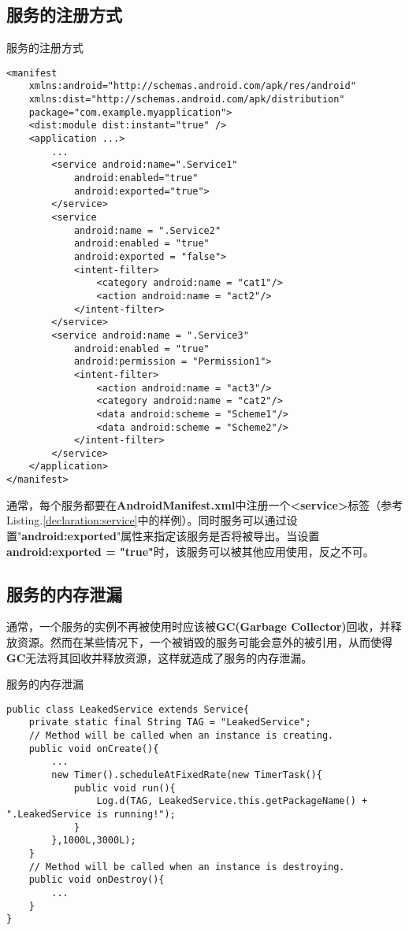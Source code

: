 \subsection{服务的注册方式}
\begin{listing}[htbp]
	\centering
	\caption{服务的注册方式}
	\begin{verbatim}
<manifest
	xmlns:android="http://schemas.android.com/apk/res/android"
	xmlns:dist="http://schemas.android.com/apk/distribution"
	package="com.example.myapplication">
	<dist:module dist:instant="true" />
	<application ...>
		...
		<service android:name=".Service1"
			android:enabled="true"
			android:exported="true">
		</service>
		<service
			android:name = ".Service2"
			android:enabled = "true"
			android:exported = "false">
			<intent-filter>
				<category android:name = "cat1"/>
				<action android:name = "act2"/>
			</intent-filter>
		</service>
		<service android:name = ".Service3"
			android:enabled = "true"
			android:permission = "Permission1">
			<intent-filter>
				<action android:name = "act3"/>
				<category android:name = "cat2"/>
				<data android:scheme = "Scheme1"/>
				<data android:scheme = "Scheme2"/>
			</intent-filter>
		</service>
	</application>
</manifest>
	\end{verbatim}
	\label{declaration:service}
\end{listing}
通常，每个服务都要在\textbf{AndroidManifest.xml}中注册一个\textbf{<service>}标签（参考Listing.\textcolor{red}{\ref{declaration:service}}中的样例）。同时服务可以通过设置"\textbf{android:exported}"属性来指定该服务是否将被导出。当设置\textbf{android:exported = "true"}时，该服务可以被其他应用使用，反之不可。
\subsection{服务的内存泄漏}\label{service_leak}
通常，一个服务的实例不再被使用时应该被\textbf{GC(Garbage Collector)}回收，并释放资源。然而在某些情况下，一个被销毁的服务可能会意外的被引用，从而使得\textbf{GC}无法将其回收并释放资源，这样就造成了服务的内存泄漏。
\begin{listing}[htbp]
	\centering
	\caption{服务的内存泄漏}
	\begin{verbatim}
public class LeakedService extends Service{
	private static final String TAG = "LeakedService";
	// Method will be called when an instance is creating.
	public void onCreate(){
		...
		new Timer().scheduleAtFixedRate(new TimerTask(){
			public void run(){
				Log.d(TAG, LeakedService.this.getPackageName() + ".LeakedService is running!");
			}
		},1000L,3000L);
	}
	// Method will be called when an instance is destroying.
	public void onDestroy(){
		...
	}
}
	\end{verbatim}
	\label{leaked example:service}
\end{listing}

